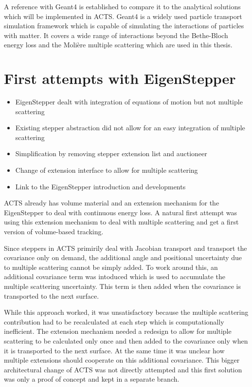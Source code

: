 A reference with Geant4 is established to compare it to the analytical solutions which will be implemented in ACTS. Geant4 is a widely used particle transport simulation framework which is capable of simulating the interactions of particles with matter. It covers a wide range of interactions beyond the Bethe-Bloch energy loss and the Molière multiple scattering which are used in this thesis.

\section{First attempts with EigenStepper}

\begin{itemize}
    \color{red}
    \item EigenStepper dealt with integration of equations of motion but not multiple scattering
    \item Existing stepper abstraction did not allow for an easy integration of multiple scattering
    \item Simplification by removing stepper extension list and auctioneer
    \item Change of extension interface to allow for multiple scattering
    \item Link to the EigenStepper introduction and developments
\end{itemize}

ACTS already has volume material and an extension mechanism for the EigenStepper to deal with continuous energy loss. A natural first attempt was using this extension mechanism to deal with multiple scattering and get a first version of volume-based tracking.

Since steppers in ACTS primirily deal with Jacobian transport and transport the covariance only on demand, the additional angle and positional uncertainty due to multiple scattering cannot be simply added. To work around this, an additional covariance term was intoduced which is used to accumulate the multiple scattering uncertainty. This term is then added when the covariance is transported to the next surface.

While this approach worked, it was unsatisfactory because the multiple scattering contribution had to be recalculated at each step which is computationally inefficient. The extension mechanism needed a redesign to allow for multiple scattering to be calculated only once and then added to the covariance only when it is transported to the next surface. At the same time it was unclear how multiple extensions should cooperate on this additional covariance. This bigger architectural change of ACTS was not directly attempted and this first solution was only a proof of concept and kept in a separate branch.

